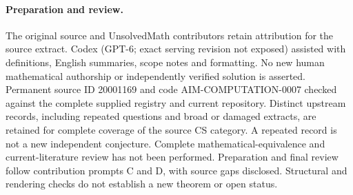 \documentclass[11pt]{article}
\begin{document}
\paragraph{Preparation and review.}
The original source and UnsolvedMath contributors retain attribution for the source extract. Codex (GPT-6; exact serving revision not exposed) assisted with definitions, English summaries, scope notes and formatting. No new human mathematical authorship or independently verified solution is asserted. Permanent source ID 20001169 and code AIM-COMPUTATION-0007 checked against the complete supplied registry and current repository. Distinct upstream records, including repeated questions and broad or damaged extracts, are retained for complete coverage of the source CS category. A repeated record is not a new independent conjecture. Complete mathematical-equivalence and current-literature review has not been performed. Preparation and final review follow contribution prompts C and D, with source gaps disclosed. Structural and rendering checks do not establish a new theorem or open status.
\label{end:20001169}
\end{document}
